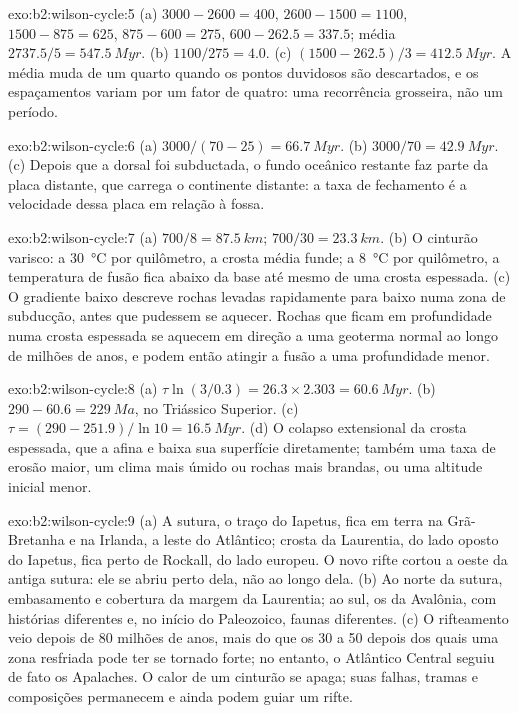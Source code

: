 \begin{solution}{exo:b2:wilson-cycle:5}
(a) $3000 - 2600 = 400$, $2600 - 1500 = 1100$, $1500 - 875 = 625$, $875 - 600 = 275$, $600 -
262.5 = 337.5$; média $2737.5/5 = \qty{547.5}{Myr}$. (b) $1100/275 = 4.0$. (c) $(1500 -
262.5)/3 = \qty{412.5}{Myr}$. A média muda de um quarto quando os pontos duvidosos são descartados,
e os espaçamentos variam por um fator de quatro: uma recorrência grosseira, não um período.
\end{solution}

\begin{solution}{exo:b2:wilson-cycle:6}
(a) $3000/(70 - 25) = \qty{66.7}{Myr}$. (b) $3000/70 = \qty{42.9}{Myr}$. (c) Depois que a dorsal
foi subductada, o fundo oceânico restante faz parte da placa distante, que carrega o continente
distante: a taxa de fechamento é a velocidade dessa placa em relação à fossa.
\end{solution}

\begin{solution}{exo:b2:wilson-cycle:7}
(a) $700/8 = \qty{87.5}{km}$; $700/30 = \qty{23.3}{km}$. (b) O cinturão varisco: a
\qty{30}{\celsius} por quilômetro, a crosta média funde; a \qty{8}{\celsius} por quilômetro,
a temperatura de fusão fica abaixo da base até mesmo de uma crosta espessada. (c) O gradiente baixo
descreve rochas levadas rapidamente para baixo numa zona de subducção, antes que pudessem se aquecer. Rochas que
ficam em profundidade numa crosta espessada se aquecem em direção a uma geoterma normal ao longo de milhões de anos, e podem
então atingir a fusão a uma profundidade menor.
\end{solution}

\begin{solution}{exo:b2:wilson-cycle:8}
(a) $\tau\ln(3/0.3) = 26.3\times2.303 = \qty{60.6}{Myr}$. (b) $290 - 60.6 = \qty{229}{Ma}$, no
Triássico Superior. (c) $\tau = (290 - 251.9)/\ln10 = \qty{16.5}{Myr}$. (d) O colapso
extensional da crosta espessada, que a afina e baixa sua superfície diretamente; também uma
taxa de erosão maior, um clima mais úmido ou rochas mais brandas, ou uma altitude inicial menor.
\end{solution}

\begin{solution}{exo:b2:wilson-cycle:9}
(a) A sutura, o traço do Iapetus, fica em terra na Grã-Bretanha e na Irlanda, a leste do
Atlântico; crosta da Laurentia, do lado oposto do Iapetus, fica perto de Rockall, do lado
europeu. O novo rifte cortou a oeste da antiga sutura: ele se abriu perto dela, não ao longo dela.
(b) Ao norte da sutura, embasamento e cobertura da margem da Laurentia; ao sul, os da
Avalônia, com histórias diferentes e, no início do Paleozoico, faunas diferentes. (c) O rifteamento
veio depois de 80 milhões de anos, mais do que os 30 a 50 depois dos quais uma zona resfriada pode ter se tornado
forte; no entanto, o Atlântico Central seguiu de fato os Apalaches. O calor de um cinturão se apaga; suas
falhas, tramas e composições permanecem e ainda podem guiar um rifte.
\end{solution}

